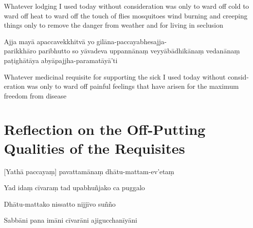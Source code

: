 \begin{english}
  Whatever lodging I used today without consideration was only to ward off
  cold to ward off heat to ward off the touch of flies mosquitoes wind
  burning and creeping things only to remove the danger from weather and for
  living in seclusion
\end{english}

Ajja mayā apaccavekkhitvā yo gilāna-paccayabhesajja-\\ parikkhāro paribhutto so
yāvadeva uppannānaṃ veyyābādhikānaṃ vedanānaṃ paṭighātāya
abyāpajjha-paramatāyā'ti

\begin{english}
  Whatever medicinal requisite for supporting the sick I used today without
  consideration was only to ward off painful feelings that have arisen for the
  maximum freedom from disease\\
\end{english}

\section[Reflection on the Off-Putting Qualities]{Reflection on the Off-Putting Qualities of the Requisites}



\begin{leader}
\end{leader}


[Yathā paccayaṃ] pavattamānaṃ dhātu-mattam-ev'etaṃ


Yad idaṃ cīvaraṃ tad upabhuñjako ca puggalo


Dhātu-mattako nissatto nijjīvo suñño


Sabbāni pana imāni cīvarāni ajigucchanīyāni

